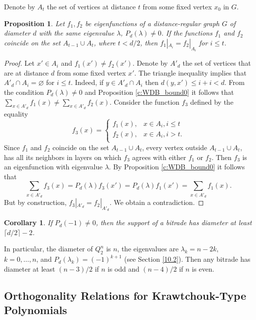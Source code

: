 \documentclass[11pt]{article}
\newtheorem{claim}{Proposition}[section]
\newtheorem{corollary}{Corollary}[section]
\theoremstyle{definition}
\begin{document}
{{ Denote by $A_t$  the set of vertices at distance
$t$ from some fixed vertex $x_0$
in  $G$.

\begin{claim}\label{c:dopeigenfun}
Let $f_1, f_2$ be eigenfunctions of a distance-regular
graph $G$ of diameter $d$ with the same eigenvalue $\lambda$,
$P_d(\lambda)\neq 0$. If the functions $f_1$ and $f_2$ coincide on
the set ${A_{t-1}\cup A_{t}}$, where $t<d/2$, then
$f_1|_{A_i}=f_2|_{A_i}$ for $i\leq t$.
\end{claim}
\begin{proof}
Let $x'\in A_i$ and $f_1(x')\neq f_2(x')$. Denote by $A'_d$  the set
of vertices that are at distance $d$ from some fixed
vertex $x'$. The triangle inequality implies that $A'_d\cap
A_i=\varnothing$ for $i\leq t$. Indeed, if $y\in A'_d\cap
A_i$ then $d(y,x')\leq i+i<d$. From the condition $P_d(\lambda)\neq 0$ and
Proposition \ref{c:WDB_bound0} it follows that $\sum\limits_{x\in
A'_d}f_1(x)\neq \sum\limits_{x\in A'_d}f_2(x)$. Consider the function
$f_3$ defined by the equality
$$f_3(x)=\left\{
\begin{array}{ll}
f_1(x), & x\in A_i, i\leq t\\
f_2(x), & x\in A_i, i>t.\\
\end{array}
\right.
$$
Since  $f_1$ and $f_2$ coincide on the set $A_{t-1}\cup A_{t}$,
every vertex outside $A_{t-1}\cup A_{t}$,
 has all its neighbors in layers on which $f_3$
agrees with either $f_1$ or $f_2$. Then $f_3$ is an eigenfunction with eigenvalue
$\lambda$. By Proposition \ref{c:WDB_bound0} it follows that
$$\sum\limits_{x\in
A'_d}f_3(x)=P_d(\lambda)f_3(x')=P_d(\lambda)f_1(x')=\sum\limits_{x\in
A'_d}f_1(x).$$ But by construction, $f_3|_{A'_d}=f_2|_{A'_d}$. We obtain a
contradiction.
\end{proof}


\begin{corollary}
If $P_d(-1)\neq 0$, then the support of a bitrade has 
diameter at least $\lceil d/2\rceil-2$.
\end{corollary}


In particular,  the diameter of  $Q^n_2$ is $n$,
the eigenvalues are $\lambda_k=n-2k$, $k=0,\dots,n$, and
$P_d(\lambda_k)=(-1)^{k+1}$ (see Section \ref{10.2}).  Then any bitrade has diameter at least $(n-3)/2$ if $n$ is odd and $(n-4)/2$ if $n$ is even.

\subsection{Orthogonality Relations for  Krawtchouk-Type Polynomials}

}}
\end{document}
